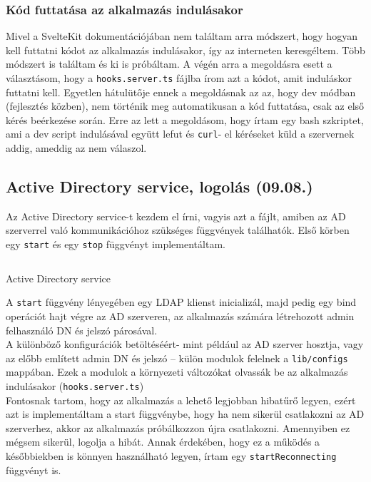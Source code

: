 \documentclass[a4paper]{article}
\newcommand{\inlts}[1]{\texttt{#1}}
\newcommand{\inltxt}[1]{\texttt{#1}}
\begin{document}
\subsubsection*{Kód futtatása az alkalmazás indulásakor}
Mivel a SvelteKit dokumentációjában nem találtam arra módszert, hogy hogyan kell futtatni kódot az
alkalmazás indulásakor, így az interneten keresgéltem. Több módszert is találtam és ki is próbáltam. A
végén arra a megoldásra esett a választásom, hogy a \inlts{hooks.server.ts} fájlba írom azt a kódot, amit
induláskor futtatni kell. Egyetlen hátulütője ennek a megoldásnak az az, hogy dev módban (fejlesztés
közben), nem történik meg automatikusan a kód futtatása, csak az első kérés beérkezése során. Erre
az lett a megoldásom, hogy írtam egy bash szkriptet, ami a dev script indulásával együtt lefut és \inltxt{curl}-
el kéréseket küld a szervernek addig, ameddig az nem válaszol.

\subsection{Active Directory service, logolás (09.08.)}

Az Active Directory service-t kezdem el írni, vagyis azt a fájlt, amiben az AD szerverrel való
kommunikációhoz szükséges függvények találhatók. Első körben egy \inlts{start} és egy \inlts{stop} függvényt
implementáltam.

\begin{listing}[!ht]
\inputminted[bgcolor=codebg, breaklines, breakanywhere, fontsize=\small]{typescript}{code/activeDirectoryService.ts}
\caption{Active Directory service}
\label{listing:3}
\end{listing}

A \inlts{start} függvény lényegében egy LDAP klienst inicializál, majd pedig egy bind operációt hajt végre az
AD szerveren, az alkalmazás számára létrehozott admin felhasználó DN és jelszó párosával.\\

A különböző konfigurációk betöltéséért- mint például az AD szerver hosztja, vagy az előbb említett
admin DN és jelszó – külön modulok felelnek a \inlts{lib/configs} mappában. Ezek a modulok a környezeti
változókat olvassák be az alkalmazás indulásakor (\inlts{hooks.server.ts}) \\

Fontosnak tartom, hogy az alkalmazás a lehető legjobban hibatűrő legyen, ezért azt is implementáltam
a start függvénybe, hogy ha nem sikerül csatlakozni az AD szerverhez, akkor az alkalmazás
próbálkozzon újra csatlakozni. Amennyiben ez mégsem sikerül, logolja a hibát. Annak érdekében, hogy
ez a működés a későbbiekben is könnyen használható legyen, írtam egy \inlts{startReconnecting}
függvényt is.
\end{document}
